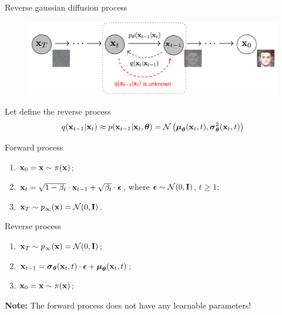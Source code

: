 \begin{frame}{Reverse gaussian diffusion process}
	\vspace{-0.3cm} 
	\begin{figure}
		\includegraphics[width=0.8\linewidth]{figs/DDPM}
	\end{figure}
	\vspace{-0.3cm} 
	Let define the reverse process
	\vspace{-0.2cm}
	\[
		q(\mathbf{x}_{t-1}|\mathbf{x}_{t}) \approx p(\mathbf{x}_{t - 1} | \mathbf{x}_t, \boldsymbol{\theta}) = \mathcal{N} \left(\boldsymbol{\mu}_{\boldsymbol{\theta}}(\mathbf{x}_t, t), \boldsymbol{\sigma}_{\boldsymbol{\theta}}^2(\mathbf{x}_t, t)\right)
	\]
	\vspace{-0.7cm}
	\begin{minipage}{0.5\linewidth}
		\begin{block}{Forward process}
			\begin{enumerate}
				\item $\mathbf{x}_0 = \mathbf{x} \sim \pi(\mathbf{x})$;
				\item $\mathbf{x}_t = \sqrt{1 - \beta_t} \cdot \mathbf{x}_{t - 1} + \sqrt{\beta_t} \cdot \boldsymbol{\epsilon}$, where $\boldsymbol{\epsilon} \sim \mathcal{N}(0, \mathbf{I})$, $t \geq 1$;
				\item $\mathbf{x}_T \sim p_{\infty}(\mathbf{x}) = \mathcal{N}(0, \mathbf{I})$.
			\end{enumerate}
		\end{block}
	\end{minipage}%
	\begin{minipage}{0.5\linewidth}
		\begin{block}{Reverse process}
			\begin{enumerate}
				\item $\mathbf{x}_T \sim p_{\infty}(\mathbf{x}) = \mathcal{N}(0, \mathbf{I})$;
				\item $\mathbf{x}_{t - 1} = \boldsymbol{\sigma}_{\boldsymbol{\theta}}(\mathbf{x}_t, t) \cdot \boldsymbol{\epsilon} + \boldsymbol{\mu}_{\boldsymbol{\theta}}(\mathbf{x}_t, t)$;
				\item $\mathbf{x}_0 = \mathbf{x} \sim \pi(\mathbf{x})$;
			\end{enumerate}
		\end{block}
	\end{minipage}
	\textbf{Note:} The forward process does not have any learnable parameters!
\end{frame}
